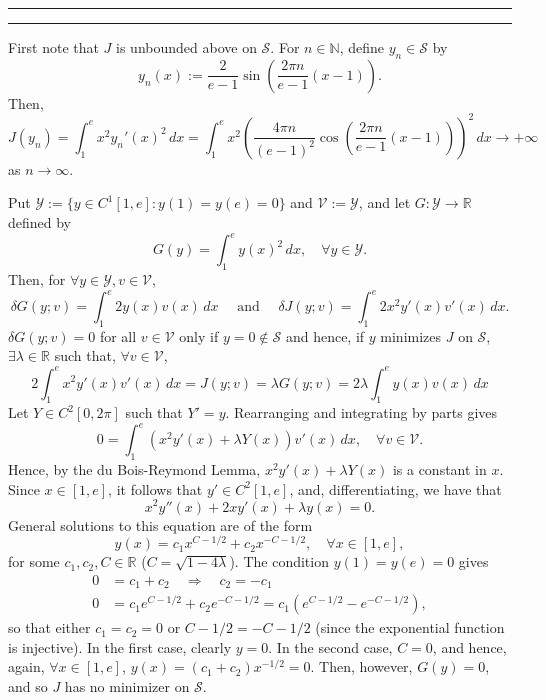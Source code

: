 \documentclass[11pt]{article}
\newcounter{questionCounter}
\newcounter{partCounter}[questionCounter]
\newenvironment{question}[2][\arabic{questionCounter}]{%
    \setcounter{partCounter}{0}%
    \vspace{.25in} \hrule \vspace{0.5em}%
        \noindent{\bf #2}%
    \vspace{0.8em} \hrule \vspace{.10in}%
    \addtocounter{questionCounter}{1}%
}{}
\newcommand{\N}{\mathbb{N}}             %
\newcommand{\R}{\mathbb{R}}             %
\renewcommand{\S}{\mathscr{S}}          %
\newcommand{\Y}{\mathscr{Y}}            %
\newcommand{\V}{\mathscr{V}}            %
\begin{document}
\newpage
\begin{question}{Problem 3}
First note that $J$ is unbounded above on $\S$. For $n \in \N$, define
$y_n \in \S$ by
\[y_n(x) := \frac{2}{e - 1} \sin\left( \frac{2\pi n}{e - 1}(x - 1) \right).\]
Then,
\[J(y_n)
    = \int_1^e x^2 y_n'(x)^2 \, dx
    = \int_1^e x^2 \left( \frac{4\pi n}{(e - 1)^2}
            \cos\left( \frac{2\pi n}{e - 1}(x - 1) \right) \right)^2 \, dx
    \to +\infty
\]
as $n \to \infty$.

Put $\Y := \{y \in C^1[1,e] : y(1) = y(e) = 0\}$ and $\V := \Y$, and let
$G : \Y \to \R$ defined by
\[G(y) = \int_1^e y(x)^2 \, dx, \quad \forall y \in \Y.\]
Then, for
$\forall y  \in \Y, v \in \V$,
\[\delta G(y;v)
    = \int_1^e 2y(x)v(x) \, dx
    \quad \mbox{ and } \quad
  \delta J(y;v)
    = \int_1^e 2x^2 y'(x)v'(x) \, dx.
\]
$\delta G(y;v) = 0$ for all $v \in \V$ only if $y = 0 \notin \S$ and hence,
if $y$ minimizes $J$ on $\S$, $\exists \lambda \in \R$ such that,
$\forall v \in \V$,
\[2\int_1^e x^2y'(x)v'(x) \, dx
    = J(y;v)
    = \lambda G(y;v)
    = 2\lambda\int_1^e y(x)v(x) \, dx
\]
Let $Y \in C^2[0,2\pi]$ such that $Y' = y$. Rearranging and integrating by
parts gives
\[0
    = \int_1^e \left( x^2y'(x) + \lambda Y(x) \right) v'(x) \, dx,
        \quad \forall v \in \V.
\]
Hence, by the du Bois-Reymond Lemma,
$x^2y'(x) + \lambda Y(x)$ is a constant in $x$. Since $x \in [1,e]$, it follows
that $y' \in C^2[1,e]$, and, differentiating, we have that
\[x^2y''(x) + 2xy'(x) + \lambda y(x) = 0.\]
General solutions to this equation are of the form
\[y(x) = c_1x^{C - 1/2} + c_2 x^{-C - 1/2}, \quad \forall x \in [1,e],\]
for some $c_1,c_2,C \in \R$ ($C = \sqrt{1 - 4\lambda}$).
The condition $y(1) = y(e) = 0$ gives
\begin{align*}
0 & = c_1 + c_2 \quad \Rightarrow \quad c_2 = -c_1 \\
0 & = c_1e^{C - 1/2} + c_2e^{-C - 1/2}
    = c_1 \left( e^{C - 1/2} - e^{-C - 1/2} \right),
\end{align*}
so that either $c_1 = c_2 = 0$ or $C - 1/2 = -C - 1/2$ (since the exponential
function is injective). In the first case, clearly $y = 0$. In the second
case, $C = 0$, and hence, again,
$\forall x \in [1,e]$, $y(x) = (c_1 + c_2)x^{-1/2} = 0$. Then, however,
$G(y) = 0$, and so $J$ has no minimizer on $\S$.
\end{question}
\end{document}
